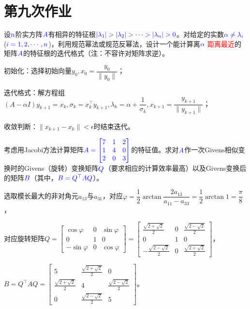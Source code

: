 \chapter{第九次作业}

    \begin{homework}[4pts]
        设$\textcolor{blue}{n}$阶实方阵$\textcolor{blue}{A}$有相异的特征根$\textcolor{blue}{|\lambda_1|>|\lambda_2|>\cdots>|\lambda_n|>0}$。对给定的实数$\textcolor{blue}{\alpha\neq\lambda_i}$ ($\textcolor{blue}{i=1,2,\cdots,n}$)，利用规范幂法或规范反幂法，设计一个能计算离$\textcolor{blue}{\alpha}$ \textcolor{red}{距离最近}的矩阵$\textcolor{blue}{A}$的特征根的迭代格式（注：不容许对矩阵求逆）。
    \end{homework}

    \begin{solution}
        初始化：选择初始向量$y_0,x_0=\dfrac{y_0}{\|y_0\|}$；

        迭代格式：解方程组$(A-\alpha I)y_{k+1}=x_k,\sigma_k=x^{\top}_k y_{k+1},\lambda_k=\alpha+\dfrac1{\sigma_k},x_{k+1}=\dfrac{y_{k+1}}{\|y_{k+1}\|}$；

        收敛判断：$\|x_{k+1}-x_k\|<\epsilon$时结束迭代。
    \end{solution}

    \begin{homework}[8pts]
        考虑用Jacobi方法计算矩阵$\textcolor{blue}{A=\begin{bmatrix}7&1&2\\1&4&0\\2&0&3\end{bmatrix}}$的特征值。求对$\textcolor{blue}{A}$作一次Givens相似变换时的Givens（旋转）变换矩阵$\textcolor{blue}{Q}$（要求相应的计算效率最高）以及Givens变换后的矩阵$\textcolor{blue}{B}$（其中，$\textcolor{blue}{B=Q^{\top} AQ}$）。
    \end{homework}

    \begin{solution}
        选取模长最大的非对角元$a_{13}$与$a_{31}$，对应$\varphi=\dfrac12\arctan\dfrac{2a_{13}}{a_{11}-a_{33}}=\dfrac12\arctan1=\dfrac{\pi}{8}$，

        对应旋转矩阵$Q=\begin{bmatrix}\cos\varphi&0&\sin\varphi\\0&1&0\\-\sin\varphi&0&\cos\varphi\end{bmatrix}=\begin{bmatrix}\frac{\sqrt{2+\sqrt{2}}}{2} & 0 & \frac{\sqrt{2-\sqrt{2}}}{2} \\0 & 1 & 0 \\-\frac{\sqrt{2-\sqrt{2}}}{2} & 0 & \frac{\sqrt{2+\sqrt{2}}}{2}\end{bmatrix}$，

        $B=Q^{\top}AQ=\begin{bmatrix}5&\frac{\sqrt{2+\sqrt{2}}}{2}&0\\\frac{\sqrt{2+\sqrt{2}}}{2}&4&\frac{\sqrt{2-\sqrt{2}}}{2}\\0&\frac{\sqrt{2-\sqrt{2}}}{2}&5\end{bmatrix}$。
    \end{solution}

